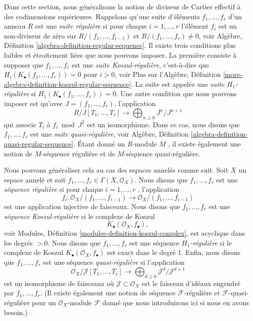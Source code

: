 \noindent
Dans cette section, nous généralisons la notion de diviseur de Cartier effectif à
des codimensions supérieures. Rappelons qu'une suite d'éléments  $f_1, \ldots, f_r$  d'un
anneau  $R$  est une  {\it  suite régulière} 
si pour chaque  $i = 1, \ldots, r$  l'élément  $f_i$  est un non-diviseur de zéro sur
 $R/(f_1, \ldots, f_{i - 1})$  et  $R/(f_1, \ldots, f_r) \not = 0$, voir Algèbre, Définition  \ref{algebra-definition-regular-sequence}. Il existe
trois conditions plus faibles et étroitement liées que nous pouvons imposer. La
première consiste à supposer que  $f_1, \ldots, f_r$  est une  {\it 
suite Koszul-régulière}, c’est-à-dire que  $H_i(K_\bullet(f_1, \ldots, f_r)) = 0$  pour
 $i > 0$, voir Plus sur l'Algèbre, Définition  \ref{more-algebra-definition-koszul-regular-sequence}. La suite est
appelée une  {\it  suite  $H_1$-régulière}  si
 $H_1(K_\bullet(f_1, \ldots, f_r)) = 0$. Une autre condition que nous pouvons imposer est qu'avec
 $J = (f_1, \ldots, f_r)$, l'application
$$
R/J[T_1, \ldots, T_r]
\longrightarrow
\bigoplus\nolimits_{n \geq 0}
J^n/J^{n + 1}
$$
qui associe  $T_i$  à  $f_i \bmod J^2$  est un isomorphisme. Dans ce cas, nous
disons que  $f_1, \ldots, f_r$  est une  {\it  suite
quasi-régulière}, voir Algèbre, Définition  \ref{algebra-definition-quasi-regular-sequence}. Étant donné un
 $R$-module  $M$ , il existe également une notion de
 $M$-séquence régulière et de  $M$-séquence quasi-régulière.

\medskip\noindent
Nous pouvons généraliser cela au cas des espaces annelés comme suit. Soit
 $X$  un espace annelé et soit  $f_1, \ldots, f_r \in \Gamma(X, \mathcal{O}_X)$. Nous disons que  $f_1, \ldots, f_r$ 
est une  {\it  séquence régulière}  si pour chaque
 $i = 1, \ldots, r$ , l'application
\begin{equation}
\label{equation-map-regular}
f_i :
\mathcal{O}_X/(f_1, \ldots, f_{i - 1})
\longrightarrow
\mathcal{O}_X/(f_1, \ldots, f_{i - 1})
\end{equation}
est une application injective de faisceaux. Nous disons que  $f_1, \ldots, f_r$  est une
 {\it  séquence Koszul-régulière}  si le complexe de
Koszul
\begin{equation}
\label{equation-koszul}
K_\bullet(\mathcal{O}_X, f_\bullet),
\end{equation}
voir Modules, Définition  \ref{modules-definition-koszul-complex}, est acyclique dans les degrés  $> 0$.
Nous disons que  $f_1, \ldots, f_r$  est une séquence  {\it 
 $H_1$-régulière}  si le complexe de Koszul  $K_\bullet(\mathcal{O}_X, f_\bullet)$  est exact
dans le degré  $1$. Enfin, nous disons que  $f_1, \ldots, f_r$  est une séquence
 {\it  quasi-régulière}  si l'application
\begin{equation}
\label{equation-map-quasi-regular}
\mathcal{O}_X/\mathcal{J}[T_1, \ldots, T_r]
\longrightarrow
\bigoplus\nolimits_{d \geq 0} \mathcal{J}^d/\mathcal{J}^{d + 1}
\end{equation}
est un isomorphisme de faisceaux où  $\mathcal{J} \subset \mathcal{O}_X$  est le faisceau d'idéaux engendré
par  $f_1, \ldots, f_r$. (Il existe également une notion de séquence
 $\mathcal{F}$-régulière et  $\mathcal{F}$-quasi-régulière pour un  $\mathcal{O}_X$-module
 $\mathcal{F}$  donné que nous introduirons ici si nous en avons besoin.)

